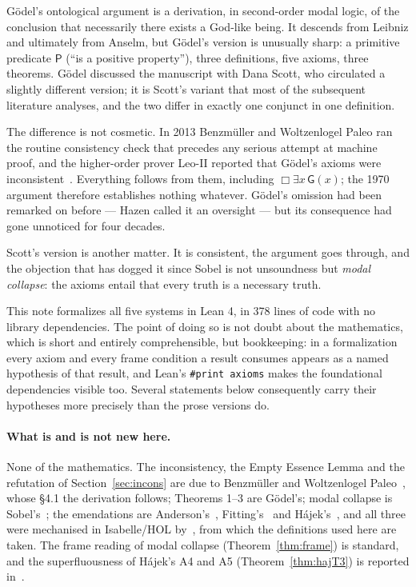 \documentclass[11pt]{article}
\theoremstyle{plain}
\theoremstyle{definition}
\newcommand{\Gd}{\mathsf{G}}
\newcommand{\Pos}{\mathsf{P}}
\begin{document}
G\"odel's ontological argument is a derivation, in second-order modal logic,
of the conclusion that necessarily there exists a God-like being. It descends
from Leibniz and ultimately from Anselm, but G\"odel's version is unusually
sharp: a primitive predicate $\Pos$ (``is a positive property''), three
definitions, five axioms, three theorems. G\"odel discussed the manuscript with
Dana Scott, who circulated a slightly different version; it is Scott's variant
that most of the subsequent literature analyses, and the two differ in exactly
one conjunct in one definition.

The difference is not cosmetic. In 2013 Benzm\"uller and Woltzenlogel Paleo ran
the routine consistency check that precedes any serious attempt at machine
proof, and the higher-order prover Leo-II reported that G\"odel's axioms were
inconsistent~\cite{bwp2016}. Everything follows from them, including
$\Box \exists x\, \Gd(x)$; the 1970 argument therefore establishes nothing
whatever. G\"odel's omission had been remarked on before --- Hazen called it an
oversight --- but its consequence had gone unnoticed for four decades.

Scott's version is another matter. It is consistent, the argument goes through,
and the objection that has dogged it since Sobel is not unsoundness but
\emph{modal collapse}: the axioms entail that every truth is a necessary truth.

This note formalizes all five systems in Lean 4, in 378 lines of code with no
library dependencies. The point of doing so is not doubt about the mathematics, which
is short and entirely comprehensible, but bookkeeping: in a formalization every
axiom and every frame condition a result consumes appears as a named hypothesis
of that result, and Lean's \verb|#print axioms| makes the foundational
dependencies visible too. Several statements below consequently carry their
hypotheses more precisely than the prose versions do.

\paragraph{What is and is not new here.}
None of the mathematics. The inconsistency, the Empty Essence Lemma and the
refutation of Section~\ref{sec:incons} are due to Benzm\"uller and Woltzenlogel
Paleo~\cite{bwp2016}, whose \S4.1 the derivation follows; Theorems 1--3 are
G\"odel's; modal collapse is Sobel's~\cite{sobel}; the emendations are
Anderson's~\cite{anderson}, Fitting's~\cite{fitting} and
H\'ajek's~\cite{hajek}, and all three were mechanised in Isabelle/HOL
by~\cite{afp,bf2020,bww2017}, from which the definitions used here are taken.
The frame reading of modal collapse (Theorem~\ref{thm:frame}) is standard, and
the superfluousness of H\'ajek's A4 and A5 (Theorem~\ref{thm:hajT3}) is
reported in~\cite{bww2017}.
\end{document}
